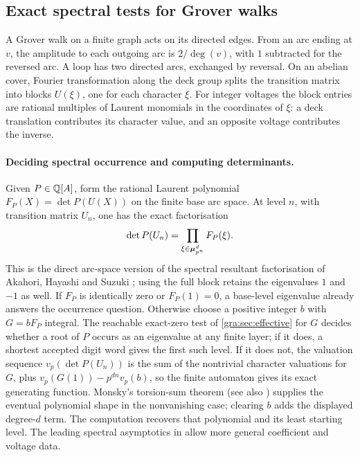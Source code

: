 \subsection{Exact spectral tests for Grover walks}\label{gra:sec:grover}

A Grover walk on a finite graph acts on its directed edges. From an arc
ending at $v$, the amplitude to each outgoing arc is $2/\deg(v)$, with $1$
subtracted for the reversed arc. A loop has two directed arcs, exchanged by
reversal. On an abelian cover, Fourier transformation along the deck group
splits the transition matrix into blocks $U(\xi)$, one for each character
$\xi$. For integer voltages the block entries are rational multiples of
Laurent monomials in the coordinates of $\xi$: a deck translation
contributes its character value, and an opposite voltage contributes the
inverse.

\paragraph{Deciding spectral occurrence and computing determinants.}
Given $P\in\mathbb{Q}[A]$, form the rational Laurent polynomial
$F_P(X)=\det P(U(X))$ on the finite base arc space. At level $n$, with
transition matrix $U_n$, one has the exact factorisation
\[
 \det P(U_n)=\prod_{\xi\in\boldsymbol{\mu}_{p^n}^d}F_P(\xi).
\]
This is the direct arc-space version of the spectral resultant
factorisation of Akahori, Hayashi and Suzuki
\cite[Theorems~3.3 and~4.3]{AkahoriHayashiSuzuki2026Grover}; using the full
block retains the eigenvalues $1$ and $-1$ as well. If $F_P$ is
identically zero or $F_P(1)=0$, a base-level eigenvalue already answers
the occurrence question. Otherwise choose a positive integer $b$ with
$G=bF_P$ integral. The reachable exact-zero test of
\cref{gra:sec:effective} for $G$ decides whether a root of $P$ occurs as an
eigenvalue at any finite layer; if it does, a shortest accepted digit word
gives the first such level. If it does not, the valuation sequence
$v_p(\det P(U_n))$ is the sum of the nontrivial character valuations for
$G$, plus $v_p(G(1))-p^{dn}v_p(b)$, so the finite automaton gives its exact
generating function. Monsky's torsion-sum theorem
\cite[Theorem~5.6]{Monsky1981Padic} (see also
\cite[Proposition~3.9]{TatenoUeki2025Iwasawa}) supplies the eventual
polynomial shape in the nonvanishing case; clearing $b$ adds the displayed
degree-$d$ term. The computation recovers that polynomial and its least
starting level. The leading spectral asymptotics in
\cite[Theorem~4.3]{AkahoriHayashiSuzuki2026Grover} allow more general
coefficient and voltage data.

